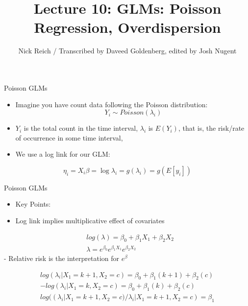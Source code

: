 \documentclass[ignorenonframetext,]{beamer}
\title{Lecture 10: GLMs: Poisson Regression, Overdispersion}
\author{Nick Reich / Transcribed by Daveed Goldenberg, edited by Josh Nugent}
\date{}
\providecommand{\tightlist}{%
  \setlength{\itemsep}{0pt}\setlength{\parskip}{0pt}}
\begin{document}
\frame{\titlepage}

\begin{frame}{Poisson GLMs}

\begin{itemize}
\tightlist
\item
  Imagine you have count data following the Poisson distribution: \[
  Y_i \sim Poisson(\lambda_i)
  \]
\item
  \(Y_i\) is the total count in the time interval, \(\lambda_i\) is
  \(E(Y_i)\), that is, the risk/rate of occurrence in some time
  interval,\\
\item
  We use a log link for our GLM:
\end{itemize}

\[
\eta_i = X_i\beta=\log{\lambda_i}=g(\lambda_i)=g(E[y_i])
\]

\end{frame}

\begin{frame}{Poisson GLMs}

\begin{itemize}
\tightlist
\item
  Key Points:
\item
  Log link implies multiplicative effect of covariates
\end{itemize}

\[
\begin{aligned}
&log(\lambda) = \beta_0 + \beta_1X_1 + \beta_2X_2\\
& \lambda = e^{\beta_0}e^{\beta_1X_1}e^{\beta_2X_2}
\end{aligned}
\] - Relative risk is the interpretation for \(e^{\beta}\)

\[
\begin{aligned}
log(\lambda_i |X_1 = k+1, X_2 = c) = \beta_0 + \beta_1(k+1) + \beta_2(c) \\
- log(\lambda_i | X_1 = k, X_2 = c) = \beta_0 + \beta_1(k) + \beta_2(c) \\
log((\lambda_i |X_1 = k+1, X_2 = c) / \lambda_i |X_1 = k+1, X_2 = c) = \beta_1
\end{aligned}
\]

\end{frame}
\end{document}
